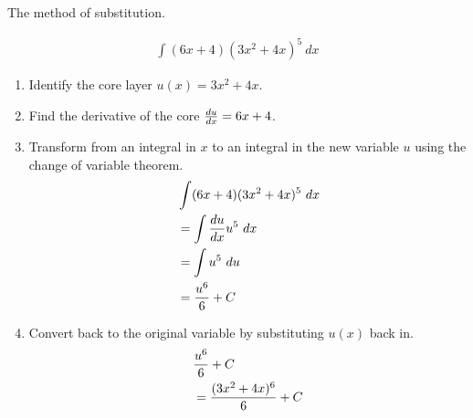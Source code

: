 \begin{exercise}\nonumber
    The method of substitution.

    \begin{align}
        \int (6x + 4)(3x^2 + 4x)^5 \ dx
    \end{align}

    \begin{enumerate}
        \item
              Identify the core layer $ u(x) = 3x^2 +4x $. \\

        \item
              Find the derivative of the core $ {du \over dx} = 6x + 4 $. \\

        \item
              Transform from an integral in $ x $ to an integral in the new variable $ u $ using the change of variable theorem. \\
              \begin{align}
                   & \int (6x + 4)(3x^2 + 4x)^5 \ dx \\
                   & = \int {du \over dx}u^5 \ dx    \\
                   & = \int u^5 \ du                 \\
                   & = {u^6 \over 6} + C
              \end{align}

        \item
              Convert back to the original variable by substituting $ u(x) $ back in.
              \begin{align}
                   & {u^6 \over 6} + C             \\
                   & = {(3x^2 + 4x)^6 \over 6} + C
              \end{align}
    \end{enumerate}
\end{exercise}

